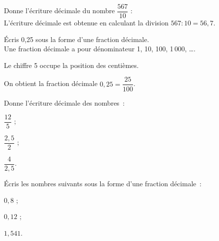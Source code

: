 \begin{methode*1}

\begin{exemple*1}
Donne l'écriture décimale du nombre $\dfrac{567}{10}$ :\\[0.5em]
L'écriture décimale est obtenue en calculant la division $567 : 10 = 56,7$.
 \end{exemple*1}
 
\begin{exemple*1}
Écris 0,25 sous la forme d'une fraction décimale. \\[0.5em]
Une fraction décimale a pour dénominateur 1, 10, 100, 1\,000, \ldots .

Le chiffre 5 occupe la position des centièmes.

On obtient la fraction décimale $0,25 = \dfrac{25}{100}$.
 \end{exemple*1}
 
  \exercice
Donne l'écriture décimale des nombres :
\begin{colenumerate}{3}
 \item $\dfrac{12}{5}$ ;
 \item $\dfrac{2,5}{2}$ ;
 \item $\dfrac{4}{2,5}$.
 \end{colenumerate}

  \exercice
Écris les nombres suivants sous la forme d'une fraction décimale :
\begin{colenumerate}{3}
 \item $0,8$ ;
 \item $0,12$ ;
 \item $1,541$.
 \end{colenumerate}

 \end{methode*1}


